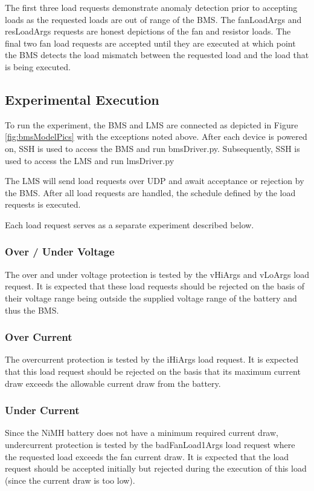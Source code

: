 \documentclass[11pt,conference,draftcls,onecolumn]{IEEEtran}
\begin{document}
The first three load requests demonstrate anomaly detection prior to accepting loads as the requested loads are out of range of the BMS.
The fanLoadArgs and resLoadArgs requests are honest depictions of the fan and resistor loads.
The final two fan load requests are accepted until they are executed at which point the BMS detects the load mismatch between the requested load and the load that is being executed.

\subsection{Experimental Execution}
To run the experiment, the BMS and LMS are connected as depicted in Figure \ref{fig:bmsModelPics} with the exceptions noted above.
After each device is powered on, SSH is used to access the BMS and run bmsDriver.py.
Subsequently, SSH is used to access the LMS and run lmsDriver.py

The LMS will send load requests over UDP and await acceptance or rejection by the BMS.
After all load requests are handled, the schedule defined by the load requests is executed.

Each load request serves as a separate experiment described below.

\subsubsection{Over / Under Voltage}
The over and under voltage protection is tested by the vHiArgs and vLoArgs load request.
It is expected that these load requests should be rejected on the basis of their voltage range being outside the supplied voltage range of the battery and thus the BMS. 

\subsubsection{Over Current}
The overcurrent protection is tested by the iHiArgs load request.
It is expected that this load request should be rejected on the basis that its maximum current draw exceeds the allowable current draw from the battery.

\subsubsection{Under Current}
Since the NiMH battery does not have a minimum required current draw, undercurrent protection is tested by the badFanLoad1Args load request where the requested load exceeds the fan current draw.
It is expected that the load request should be accepted initially but rejected during the execution of this load (since the current draw is too low).
\end{document}
